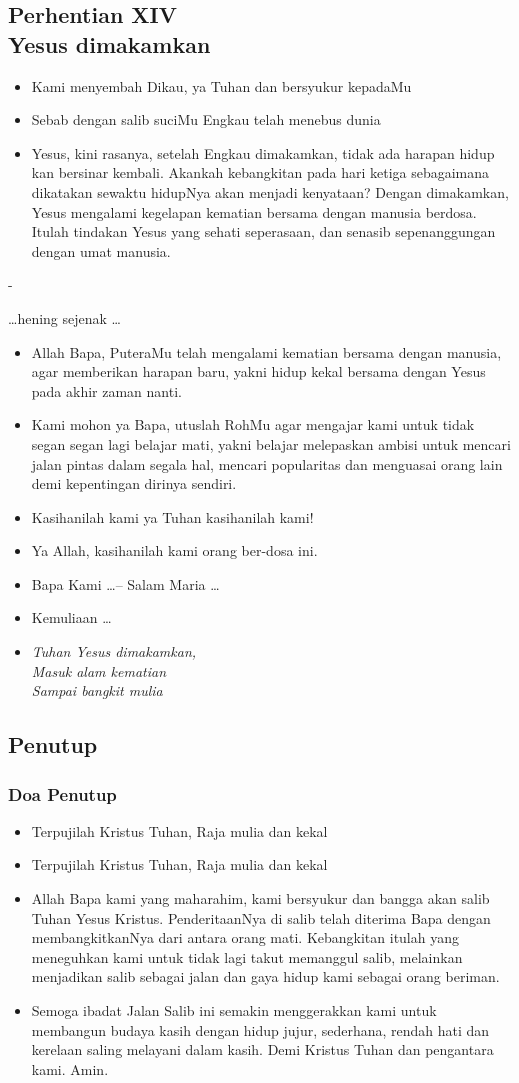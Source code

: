 \documentclass[a5paper,headsepline,titlepage,10pt,nnormalheadings,DIVcalc]{scrbook}
\newcommand{\BU}[1]{\begin{itemize} \item[U:] #1 \end{itemize}}
\newcommand{\BP}[1]{\begin{itemize} \item[P:] #1 \end{itemize}}
\newcommand{\BL}[1]{\begin{itemize} \item[L:] #1 \end{itemize}}
\begin{document}
\subsection*{Perhentian XIV
\\Yesus dimakamkan}

\BP{Kami menyembah Dikau, ya Tuhan dan bersyukur kepadaMu}
\BU{Sebab dengan salib suciMu Engkau telah menebus dunia}
\BL{Yesus, kini rasanya, setelah Engkau dimakamkan, tidak ada harapan hidup kan bersinar kembali. Akankah kebangkitan pada hari ketiga sebagaimana dikatakan sewaktu hidupNya akan menjadi kenyataan? Dengan dimakamkan, Yesus mengalami kegelapan kematian bersama dengan manusia berdosa. Itulah tindakan Yesus yang sehati seperasaan, dan senasib sepenanggungan dengan umat manusia.}

-\begin{center}\dots hening sejenak \dots\end{center}

\BP{Allah Bapa, PuteraMu telah mengalami kematian bersama dengan manusia, agar memberikan harapan baru, yakni hidup kekal bersama dengan Yesus pada akhir zaman nanti.}
\BU{Kami mohon ya Bapa, utuslah RohMu agar mengajar kami untuk tidak segan segan lagi belajar mati, yakni belajar melepaskan ambisi untuk mencari jalan pintas dalam segala hal, mencari popularitas dan menguasai orang lain demi kepentingan dirinya sendiri.}
\BP{Kasihanilah kami ya Tuhan kasihanilah kami!}
\BU{Ya Allah, kasihanilah kami orang ber-dosa ini.}
\BP{Bapa Kami \dots -- Salam Maria \dots}
\BP{Kemuliaan \dots}

\begin{itemize}
\item[15.] \it{Tuhan Yesus dimakamkan,\\
Masuk alam kematian\\
Sampai bangkit mulia}
\end{itemize}


\subsection*{Penutup}

\subsubsection*{Doa Penutup}

\BP{Terpujilah Kristus Tuhan, Raja mulia dan kekal}
\BU{Terpujilah Kristus Tuhan, Raja mulia dan kekal}
\BP{Allah Bapa kami yang maharahim, kami bersyukur dan bangga akan salib Tuhan Yesus Kristus. PenderitaanNya di salib telah diterima Bapa dengan membangkitkanNya dari antara orang mati. Kebangkitan itulah yang meneguhkan kami untuk tidak lagi takut memanggul salib, melainkan menjadikan salib sebagai jalan dan gaya hidup kami sebagai orang beriman.}
\BU{Semoga ibadat Jalan Salib ini semakin menggerakkan kami untuk membangun budaya kasih dengan hidup jujur, sederhana, rendah hati dan kerelaan saling melayani dalam kasih. Demi Kristus Tuhan dan pengantara kami. Amin.}
\end{document}
